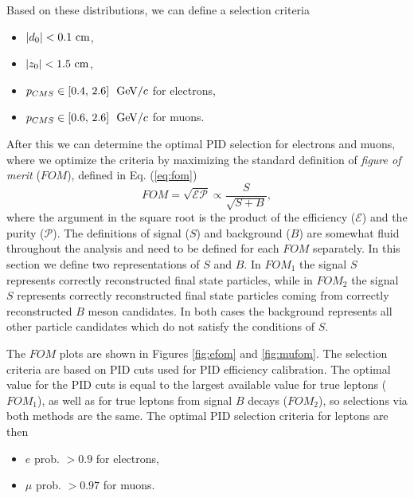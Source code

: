 Based on these distributions, we can define a selection criteria
\begin{itemize}
	\item $\vert d_0 \vert < 0.1\mathrm{~cm}$,
	\item $\vert z_0 \vert < 1.5\mathrm{~cm}$,
	\item $p_{CMS} \in [0.4,\,2.6]~\mathrm{~GeV}/c$ for electrons,
	\item $p_{CMS} \in [0.6,\,2.6]~\mathrm{~GeV}/c$ for muons.
\end{itemize}

After this we can determine the optimal PID selection for electrons and muons, where we optimize the criteria by maximizing the standard definition of \textit{figure of merit} ($FOM$), defined in Eq. (\ref{eq:fom})
\begin{equation}
\label{eq:fom}
FOM = \sqrt{\mathcal{E}\mathcal{P}} \propto \frac{S}{\sqrt{S+B}},
\end{equation} 
where the argument in the square root is the product of the efficiency ($\mathcal{E}$) and the purity ($\mathcal{P}$). The definitions of signal ($S$) and background ($B$) are somewhat fluid throughout the analysis and need to be defined for each $FOM$ separately. In this section we define two representations of $S$ and $B$. In $FOM_1$ the signal $S$ represents correctly reconstructed final state particles, while in $FOM_2$ the signal $S$ represents correctly reconstructed final state particles coming from correctly reconstructed $B$ meson candidates. In both cases the background represents all other particle candidates which do not satisfy the conditions of $S$.

The $FOM$ plots are shown in Figures \ref{fig:efom} and \ref{fig:mufom}. The selection criteria are based on PID cuts used for PID efficiency calibration. The optimal value for the PID cuts is equal to the largest available value for true leptons ($FOM_1$), as well as for true leptons from signal $B$ decays ($FOM_2$), so selections via both methods are the same. The optimal PID selection criteria for leptons are then
\begin{itemize}
	\item $e$ prob. $ > 0.9$ for electrons,
	\item $\mu$ prob. $ > 0.97$ for muons.
\end{itemize}

